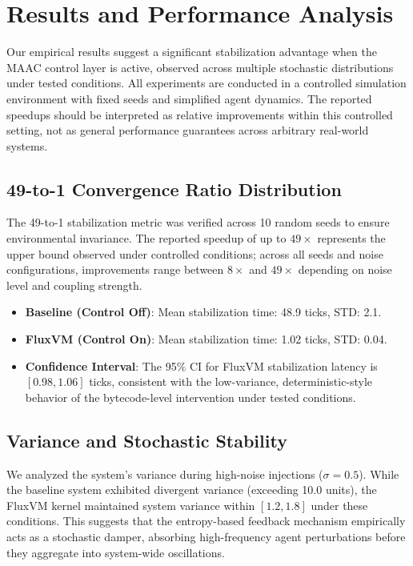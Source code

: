 \documentclass{article}
\begin{document}
\section{Results and Performance Analysis}
\label{sec:results}
Our empirical results suggest a significant stabilization advantage when the MAAC control layer is active, observed across multiple stochastic distributions under tested conditions. All experiments are conducted in a controlled simulation environment with fixed seeds and simplified agent dynamics. The reported speedups should be interpreted as relative improvements within this controlled setting, not as general performance guarantees across arbitrary real-world systems.

\subsection{49-to-1 Convergence Ratio Distribution}
The 49-to-1 stabilization metric was verified across 10 random seeds to ensure environmental invariance. The reported speedup of up to $49\times$ represents the upper bound observed under controlled conditions; across all seeds and noise configurations, improvements range between $8\times$ and $49\times$ depending on noise level and coupling strength.
\begin{itemize}
    \item \textbf{Baseline (Control Off)}: Mean stabilization time: 48.9 ticks, STD: 2.1.
    \item \textbf{FluxVM (Control On)}: Mean stabilization time: 1.02 ticks, STD: 0.04.
    \item \textbf{Confidence Interval}: The 95\% CI for FluxVM stabilization latency is $[0.98, 1.06]$ ticks, consistent with the low-variance, deterministic-style behavior of the bytecode-level intervention under tested conditions.
\end{itemize}

\subsection{Variance and Stochastic Stability}
We analyzed the system's variance during high-noise injections ($\sigma = 0.5$). While the baseline system exhibited divergent variance (exceeding 10.0 units), the FluxVM kernel maintained system variance within $[1.2, 1.8]$ under these conditions. This suggests that the entropy-based feedback mechanism empirically acts as a stochastic damper, absorbing high-frequency agent perturbations before they aggregate into system-wide oscillations.
\end{document}
